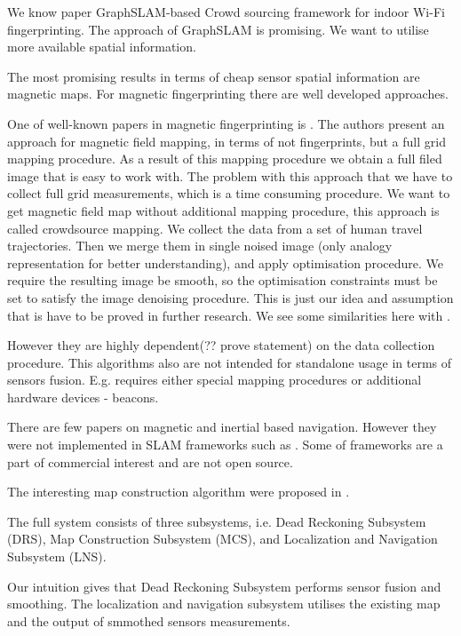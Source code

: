 \documentclass{article}
\begin{document}
We know paper GraphSLAM-based Crowd sourcing framework for indoor Wi-Fi fingerprinting\cite{7809951}. The approach of GraphSLAM is promising. We want to utilise more available spatial information.

The most promising results in terms of cheap sensor spatial information are magnetic maps. For magnetic fingerprinting there are well developed approaches.

One of well-known papers in magnetic fingerprinting is \cite{Grand20123AxisMF}. The authors present an approach for magnetic field mapping, in terms of not fingerprints, but a full grid mapping procedure. As a result of this mapping procedure we obtain a full filed image that is easy to work with.
The problem with this approach that we have to collect full grid measurements, which is a time consuming procedure. We want to get magnetic field map without additional mapping procedure, this approach is called crowdsource mapping. We collect the data from a set of human travel trajectories. Then we merge them in single noised image (only analogy representation for better understanding), and apply optimisation procedure. We require the resulting image be smooth, so the optimisation constraints must be set to satisfy the image denoising procedure. This is just our idea and assumption that is have to be proved in further research.
We see some similarities here with \cite{6827640}.

However they are highly dependent(?? prove statement) on the data collection procedure. This algorithms also are not intended for standalone usage in terms of sensors fusion. E.g. requires either special mapping procedures or additional hardware devices - beacons.

There are few papers on magnetic and inertial based navigation. However they were not implemented in SLAM frameworks such as \cite{7809951}. Some of frameworks are a part of commercial interest and are not open source.

The interesting map construction algorithm were proposed in \cite{6827640}. 

The full system consists of three subsystems, i.e. Dead Reckoning Subsystem (DRS), Map Construction Subsystem (MCS), and Localization and Navigation Subsystem (LNS). 

Our intuition gives that Dead Reckoning Subsystem performs sensor fusion and smoothing. The localization and navigation subsystem utilises the existing map and the output of smmothed sensors measurements.
\end{document}
